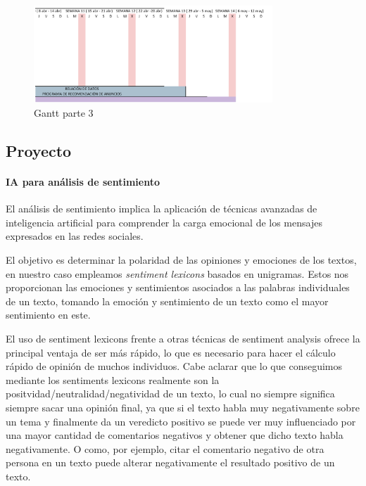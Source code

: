 \documentclass[
  letterpaper,
  DIV=11,
  numbers=noendperiod]{scrartcl}
\let\oldparagraph\paragraph
\renewcommand{\paragraph}[1]{\oldparagraph{#1}\mbox{}}
\begin{document}
\begin{figure}[htbp]
    \centering
    \includegraphics[width=0.8\textwidth, height=0.4\textheight]{gant3.png}
    \caption{Gantt parte 3}
    \label{fig:gantt3}
\end{figure}

\newpage{}

\subsection{Proyecto}\label{proyecto}

\paragraph{IA para análisis de
sentimiento}\label{ia-para-anuxe1lisis-de-sentimiento}

El análisis de sentimiento implica la aplicación de técnicas avanzadas
de inteligencia artificial para comprender la carga emocional de los
mensajes expresados en las redes sociales.

El objetivo es determinar la polaridad de las opiniones y emociones de
los textos, en nuestro caso empleamos \emph{sentiment lexicons} basados
en unigramas. Estos nos proporcionan las emociones y sentimientos
asociados a las palabras individuales de un texto, tomando la emoción y
sentimiento de un texto como el mayor sentimiento en este.

El uso de sentiment lexicons frente a otras técnicas de sentiment
analysis ofrece la principal ventaja de ser más rápido, lo que es
necesario para hacer el cálculo rápido de opinión de muchos individuos.
Cabe aclarar que lo que conseguimos mediante los sentiments lexicons
realmente son la positvidad/neutralidad/negatividad de un texto, lo cual
no siempre significa siempre sacar una opinión final, ya que si el texto
habla muy negativamente sobre un tema y finalmente da un veredicto
positivo se puede ver muy influenciado por una mayor cantidad de
comentarios negativos y obtener que dicho texto habla negativamente. O
como, por ejemplo, citar el comentario negativo de otra persona en un
texto puede alterar negativamente el resultado positivo de un texto.
\end{document}

